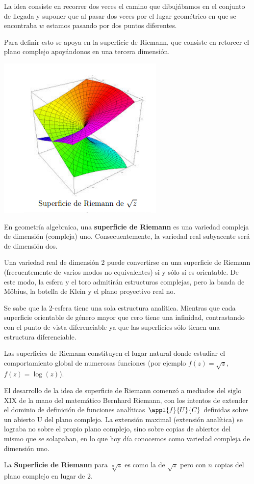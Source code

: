\documentclass{apuntes}
\begin{document}
La idea consiste en recorrer dos veces el camino que dibujábamos en el conjunto de llegada y suponer que al pasar dos veces por el lugar geométrico en que se encontraba $w$ estamos pasando por dos puntos diferentes.

Para definir esto se apoya en la superficie de Riemann, que consiste en retorcer el plano complejo apoyándonos en una tercera dimensión.
\begin{center}
\includegraphics[scale=0.75]{img/supRiemann.png}
\end{center}

\begin{defn}
En geometría algebraica, una \textbf{superficie de Riemann} es una variedad compleja de dimensión (compleja) uno. Consecuentemente, la variedad real subyacente será de dimensión dos.

Una variedad real de dimensión 2 puede convertirse en una superficie de Riemann (frecuentemente de varios modos no equivalentes) si y sólo sí es orientable. De este modo, la esfera y el toro admitirán estructuras complejas, pero la banda de Möbius, la botella de Klein y el plano proyectivo real no.

Se sabe que la 2-esfera tiene una sola estructura analítica. Mientras que cada superficie orientable de género mayor que cero tiene una infinidad, contrastando con el punto de vista diferenciable ya que las superficies sólo tienen una estructura diferenciable.

Las superficies de Riemann constituyen el lugar natural donde estudiar el comportamiento global de numerosas funciones (por ejemplo $f(z)=\sqrt{z}$, $f(z)=\log(z)$).

El desarrollo de la idea de superficie de Riemann comenzó a mediados del siglo XIX de la mano del matemático Bernhard Riemann, con los intentos de extender el dominio de definición de funciones analíticas $\appl{f}{U}{C}$ definidas sobre un abierto U del plano complejo. La extensión maximal (extensión analítica) se lograba no sobre el propio plano complejo, sino sobre copias de abiertos del mismo que se solapaban, en lo que hoy día conocemos como variedad compleja de dimensión uno.

La \textbf{Superficie de Riemann} para $\sqrt[n]{z}$ es como la de $\sqrt{z}$ pero con $n$ copias del plano complejo en lugar de 2.
\end{defn}
\end{document}
